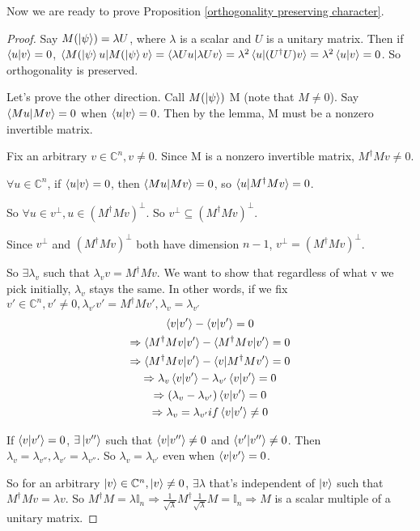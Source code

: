 \bigskip
Now we are ready to prove Proposition \ref{orthogonality preserving character}.
\begin{proof}
Say $M(\ket{\psi})=\lambda U$, where $\lambda$ is a scalar and $U$ is a unitary matrix.
Then if $\braket{u|v}=0$, $\braket{M(\ket{\psi}u|M(\ket{\psi}v}=\braket{\lambda Uu|\lambda Uv}=\lambda^2 \braket{u|(U^\dagger U)v}=\lambda^2 \braket{u|v}=0$. So orthogonality is preserved.

\bigskip
Let's prove the other direction. Call $M(\ket{\psi})$ M (note that $M \ne 0$). Say $\braket{Mu|Mv}=0$ when $\braket{u|v}=0$. Then by the lemma, M must be a nonzero invertible matrix. 

Fix an arbitrary $v \in \mathbb{C}^n, v \ne 0$. Since M is a nonzero invertible matrix, $M^\dagger M v \ne 0$.

$\forall u \in \mathbb{C}^n$, if $\braket{u|v}=0$, then $\braket{Mu|Mv}=0$, so $\braket{u|M^\dagger Mv}=0$.

So $\forall u \in v^\perp, u \in (M^\dagger Mv)^\perp$. So $v^\perp \subseteq (M^\dagger Mv)^\perp$.

Since $v^\perp$ and $(M^\dagger Mv)^\perp$ both have dimension $n-1$, $v^\perp = (M^\dagger Mv)^\perp$.

So $\exists \lambda_v$ such that $\lambda_v v = M^\dagger M v$. We want to show that regardless of what v we pick initially, $\lambda_v$ stays the same. In other words, if we fix $v' \in \mathbb{C}^n, v' \ne 0, \lambda_{v'} v' = M^\dagger M v', \lambda_v = \lambda_{v'}$
\begin{gather*}
\braket{v|v'}-\braket{v|v'}=0\\
\Rightarrow \braket{M^\dagger M v|v'}-\braket{M^\dagger M v|v'}=0\\
\Rightarrow \braket{M^\dagger M v|v'}-\braket{v|M^\dagger M v'}=0\\
\Rightarrow \lambda_v \braket{v|v'}-\lambda_{v'} \braket{v|v'}=0\\
\Rightarrow (\lambda_v -\lambda_{v'}) \braket{v|v'}=0\\
\Rightarrow  \lambda_v = \lambda_{v'} if \braket{v|v'} \ne 0
\end{gather*}

If $\braket{v|v'}=0$, $\exists \ket{v''}$ such that $\braket{v|v''} \ne 0$ and $\braket{v'|v''} \ne 0$. Then $\lambda_v =\lambda_{v''}, \lambda_{v'}=\lambda_{v''}$. So $\lambda_v=\lambda_{v'}$ even when $\braket{v|v'}=0$.

So for an arbitrary $\ket{v} \in \mathbb{C}^n, \ket{v} \ne 0$, $\exists \lambda$ that's independent of $\ket{v}$ such that $M^\dagger M v = \lambda v$. So $M^\dagger M=\lambda \mathbb{I}_n\Rightarrow \frac{1}{\sqrt{\lambda}}M^\dagger \frac{1}{\sqrt{\lambda}} M=\mathbb{I}_n\Rightarrow M$ is a scalar multiple of a unitary matrix.
\end{proof}

